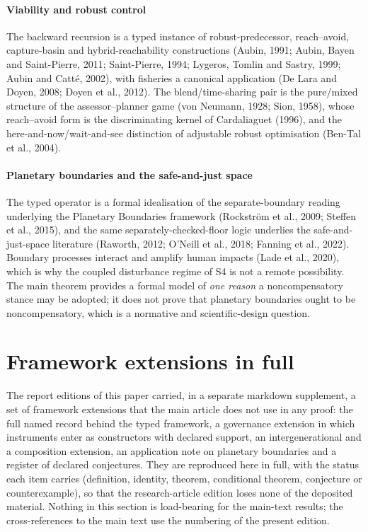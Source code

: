 \paragraph{Viability and robust control} The backward recursion is a typed instance of robust-predecessor, reach--avoid, capture-basin and hybrid-reachability constructions (Aubin, 1991; Aubin, Bayen and Saint-Pierre, 2011; Saint-Pierre, 1994; Lygeros, Tomlin and Sastry, 1999; Aubin and Catt\'e, 2002), with fisheries a canonical application (De Lara and Doyen, 2008; Doyen et al., 2012). The blend/time-sharing pair is the pure/mixed structure of the assessor--planner game (von Neumann, 1928; Sion, 1958), whose reach--avoid form is the discriminating kernel of Cardaliaguet (1996), and the here-and-now/wait-and-see distinction of adjustable robust optimisation (Ben-Tal et al., 2004).

\paragraph{Planetary boundaries and the safe-and-just space} The typed operator is a formal idealisation of the separate-boundary reading underlying the Planetary Boundaries framework (Rockstr\"om et al., 2009; Steffen et al., 2015), and the same separately-checked-floor logic underlies the safe-and-just-space literature (Raworth, 2012; O'Neill et al., 2018; Fanning et al., 2022). Boundary processes interact and amplify human impacts (Lade et al., 2020), which is why the coupled disturbance regime of S4 is not a remote possibility. The main theorem provides a formal model of \emph{one reason} a noncompensatory stance may be adopted; it does not prove that planetary boundaries ought to be noncompensatory, which is a normative and scientific-design question.

\section{Framework extensions in full}\label{si:framework}

The report editions of this paper carried, in a separate markdown supplement, a set of framework extensions that the main article does not use in any proof: the full named record behind the typed framework, a governance extension in which instruments enter as constructors with declared support, an intergenerational and a composition extension, an application note on planetary boundaries and a register of declared conjectures. They are reproduced here in full, with the status each item carries (definition, identity, theorem, conditional theorem, conjecture or counterexample), so that the research-article edition loses none of the deposited material. Nothing in this section is load-bearing for the main-text results; the cross-references to the main text use the numbering of the present edition.

